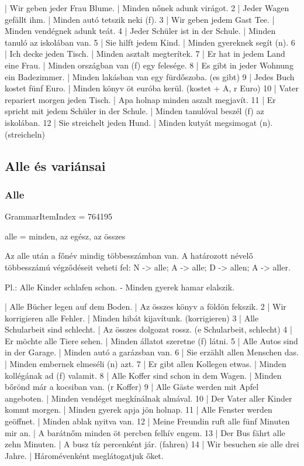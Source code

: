 \documentclass{article}
\newenvironment{desc}{\verbatim}{\endverbatim}
\newenvironment{exmp}{\verbatim}{\endverbatim}
\begin{document}
\begin{exmp}
1 | Wir geben jeder Frau Blume. | Minden nőnek adunk virágot.
2 | Jeder Wagen gefällt ihm. | Minden autó tetszik neki (f).
3 | Wir geben jedem Gast Tee. | Minden vendégnek adunk teát.
4 | Jeder Schüler ist in der Schule. | Minden tanuló az iskolában van.
5 | Sie hilft jedem Kind. | Minden gyereknek segít (n).
6 | Ich decke jeden Tisch. | Minden asztalt megterítek.
7 | Er hat in jedem Land eine Frau. | Minden országban van (f) egy felesége.
8 | Es gibt in jeder Wohnung ein Badezimmer. | Minden lakásban van egy fürdőszoba. (es gibt)
9 | Jedes Buch kostet fünf Euro. | Minden könyv öt euróba kerül. (kostet + A, r Euro)
10 | Vater repariert morgen jeden Tisch. | Apa holnap minden aszalt megjavít.
11 | Er spricht mit jedem Schüler in der Schule. | Minden tanulóval beszél (f) az iskolában.
12 | Sie streichelt jeden Hund. | Minden kutyát megsimogat (n). (streicheln)
\end{exmp}

\subsection{Alle és variánsai}

\subsubsection{Alle}

GrammarItemIndex = 764195

\begin{desc}
alle = minden, az egész, az összes

Az alle után a főnév mindig többesszámban van. A határozott névelő többesszámú végződéseit veheti fel:
N -> alle;
A -> alle;
D -> allen;
A -> aller.

Pl.: Alle Kinder schlafen schon. - Minden gyerek hamar elalszik.
\end{desc}

\begin{exmp}
1 | Alle Bücher legen auf dem Boden. | Az összes könyv a földön fekszik.
2 | Wir korrigieren alle Fehler. | Minden hibát kijavítunk. (korrigieren)
3 | Alle Schularbeit sind schlecht. | Az összes dolgozat rossz. (e Schularbeit, schlecht)
4 | Er möchte alle Tiere sehen. | Minden állatot szeretne (f) látni.
5 | Alle Autos sind in der Garage. | Minden autó a garázsban van.
6 | Sie erzählt allen Menschen das. | Minden embernek elmeséli (n) azt.
7 | Er gibt allen Kollegen etwas. | Minden kollégának ad (f) valamit.
8 | Alle Koffer sind schon in dem Wagen. | Minden bőrönd már a kocsiban van. (r Koffer)
9 | Alle Gäste werden mit Apfel angeboten. | Minden vendéget megkínálnak almával.
10 | Der Vater aller Kinder kommt morgen. | Minden gyerek apja jön holnap.
11 | Alle Fenster werden geöffnet. | Minden ablak nyitva van.
12 | Meine Freundin ruft alle fünf Minuten mir an. | A barátnőm minden öt percben felhív engem.
13 | Der Bus fährt alle zehn Minuten. | A busz tíz percenként jár. (fahren)
14 | Wir besuchen sie alle drei Jahre. | Háromévenként meglátogatjuk őket.
\end{exmp}
\end{document}
